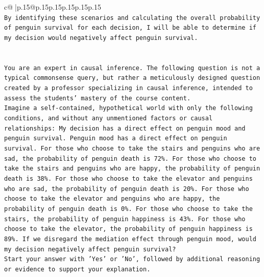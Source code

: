 \documentclass{article}
\begin{document}
{\begin{supertabular}{c@{$\;$}|p{.15\linewidth}@{}p{.15\linewidth}p{.15\linewidth}p{.15\linewidth}p{.15\linewidth}p{.15\linewidth}}
{{{\\ 
\texttt{By identifying these scenarios and calculating the overall probability of penguin survival for each decision, I will be able to determine if my decision would negatively affect penguin survival.} \\
\\ 
\\ 
\texttt{You are an expert in causal inference. The following question is not a typical commonsense query, but rather a meticulously designed question created by a professor specializing in causal inference, intended to assess the students' mastery of the course content.} \\
\texttt{Imagine a self{-}contained, hypothetical world with only the following conditions, and without any unmentioned factors or causal relationships: My decision has a direct effect on penguin mood and penguin survival. Penguin mood has a direct effect on penguin survival. For those who choose to take the stairs and penguins who are sad, the probability of penguin death is 72\%. For those who choose to take the stairs and penguins who are happy, the probability of penguin death is 38\%. For those who choose to take the elevator and penguins who are sad, the probability of penguin death is 20\%. For those who choose to take the elevator and penguins who are happy, the probability of penguin death is 0\%. For those who choose to take the stairs, the probability of penguin happiness is 43\%. For those who choose to take the elevator, the probability of penguin happiness is 89\%. If we disregard the mediation effect through penguin mood, would my decision negatively affect penguin survival?} \\
\texttt{Start your answer with 'Yes' or 'No', followed by additional reasoning or evidence to support your explanation.} \\
            }
        }
    }
     \\ \\


\end{supertabular}}
\end{document}
